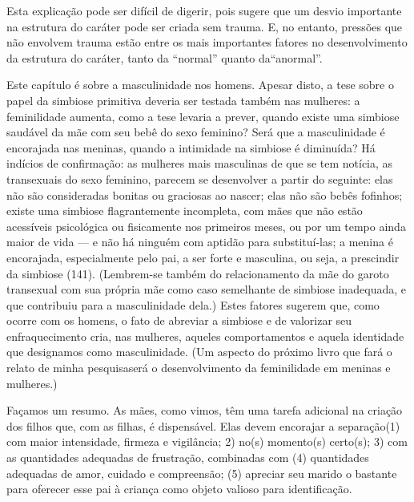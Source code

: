Esta explicação pode ser difícil de digerir, pois sugere que um
desvio importante na estrutura do caráter pode ser criada sem trauma.
E, no entanto, pressões\idxtransepres{} que não envolvem trauma estão entre os mais
importantes fatores no desenvolvimento da estrutura do caráter, tanto
da ``normal'' quanto da\idxtransepres[|)]
``anormal''.

Este capítulo é sobre a masculinidade nos homens. Apesar disto, a
tese sobre o papel da simbiose primitiva deveria ser testada também
nas mulheres: a feminilidade aumenta, como a tese levaria a prever,
quando existe uma simbiose saudável da mãe com seu bebê do sexo
feminino? Será que a masculinidade é encorajada nas meninas, quando a
intimidade na simbiose é diminuída? Há indícios de confirmação: as
mulheres mais masculinas de que se tem notícia, as transexuais do sexo\idxtransetran{}
feminino,\idxmascumul{} parecem se desenvolver a partir do seguinte: elas não são
consideradas bonitas ou graciosas ao nascer; elas não são bebês
fofinhos; existe uma simbiose flagrantemente incompleta, com mães que
não estão acessíveis psicológica ou fisicamente nos primeiros meses,
ou por um tempo ainda maior de vida --- e não há ninguém com aptidão
para substituí-las; a menina é encorajada, especialmente pelo pai, a
ser forte e masculina, ou seja, a prescindir da simbiose (141).
(Lembrem-se também do relacionamento da mãe do garoto transexual com
sua própria mãe como caso semelhante de simbiose inadequada, e que
contribuiu para a masculinidade dela.) Estes fatores sugerem que, como
ocorre com os homens, o fato de abreviar a simbiose e de valorizar seu
enfraquecimento cria, nas mulheres, aqueles comportamentos e aquela
identidade que designamos como masculinidade. (Um aspecto do próximo
livro que fará o relato de minha pesquisa\idxmaestran[|)] será o desenvolvimento da
feminilidade em meninas e mulheres.)\idxtransesimb[|)]

Façamos um resumo. As mães, como vimos, têm uma tarefa adicional na
criação dos filhos que, com as filhas, é dispensável. Elas devem
encorajar a\idxpervproce{} separação\idxmaesproc[|(] (1) com maior intensidade, firmeza e vigilância;
2) no(s) momento(s) certo(s); 3) com as quantidades adequadas de
frustração, combinadas com (4) quantidades adequadas de amor, cuidado e
compreensão; (5) apreciar seu marido o bastante para oferecer esse pai
à criança como objeto valioso para identificação.

